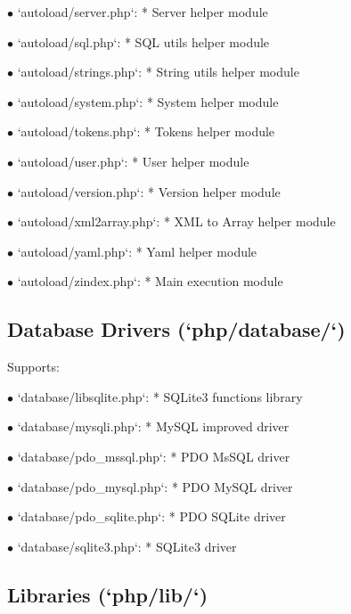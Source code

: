 \documentclass[a4paper]{article}
\begin{document}
\begin{compactitem}
\item[\color{myblue}$\bullet$] `autoload/server.php`: * Server helper module
\item[\color{myblue}$\bullet$] `autoload/sql.php`: * SQL utils helper module
\item[\color{myblue}$\bullet$] `autoload/strings.php`: * String utils helper module
\item[\color{myblue}$\bullet$] `autoload/system.php`: * System helper module
\item[\color{myblue}$\bullet$] `autoload/tokens.php`: * Tokens helper module
\item[\color{myblue}$\bullet$] `autoload/user.php`: * User helper module
\item[\color{myblue}$\bullet$] `autoload/version.php`: * Version helper module
\item[\color{myblue}$\bullet$] `autoload/xml2array.php`: * XML to Array helper module
\item[\color{myblue}$\bullet$] `autoload/yaml.php`: * Yaml helper module
\item[\color{myblue}$\bullet$] `autoload/zindex.php`: * Main execution module
\end{compactitem}

\hypertarget{toc4}{}
\subsection{Database Drivers (`php/database/`)}

Supports:

\begin{compactitem}
\item[\color{myblue}$\bullet$] `database/libsqlite.php`: * SQLite3 functions library
\item[\color{myblue}$\bullet$] `database/mysqli.php`: * MySQL improved driver
\item[\color{myblue}$\bullet$] `database/pdo\_mssql.php`: * PDO MsSQL driver
\item[\color{myblue}$\bullet$] `database/pdo\_mysql.php`: * PDO MySQL driver
\item[\color{myblue}$\bullet$] `database/pdo\_sqlite.php`: * PDO SQLite driver
\item[\color{myblue}$\bullet$] `database/sqlite3.php`: * SQLite3 driver
\end{compactitem}

\hypertarget{toc5}{}
\subsection{Libraries (`php/lib/`)}
\end{document}
